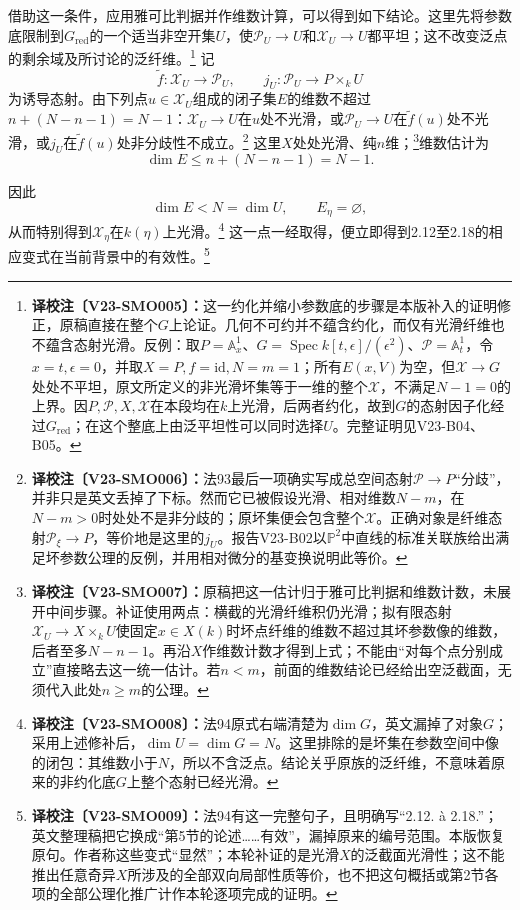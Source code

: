 \documentclass[UTF8,a4paper]{ctexbook}
\DeclareMathOperator{\Spec}{Spec}
\newcommand{\id}{\mathrm{id}}
\newcommand{\cmt}[2]{\footnote{\textbf{译校注〔#1〕：}#2}}
\begin{document}
借助这一条件，应用雅可比判据并作维数计算，可以得到如下结论。这里先将参数底限制到$G_{\mathrm{red}}$的一个适当非空开集$U$，使$\mathcal P_U\to U$和$\mathcal X_U\to U$都平坦；这不改变泛点的剩余域及所讨论的泛纤维。\cmt{V23-SMO005}{这一约化并缩小参数底的步骤是本版补入的证明修正，原稿直接在整个$G$上论证。几何不可约并不蕴含约化，而仅有光滑纤维也不蕴含态射光滑。反例：取$P=\mathbb A^1_x$、$G=\Spec k[t,\epsilon]/(\epsilon^2)$、$\mathcal P=\mathbb A^1_t$，令$x=t,\epsilon=0$，并取$X=P,f=\id,N=m=1$；所有$E(x,V)$为空，但$\mathcal X\to G$处处不平坦，原文所定义的非光滑坏集等于一维的整个$\mathcal X$，不满足$N-1=0$的上界。因$P,\mathcal P,X,\mathcal X$在本段均在$k$上光滑，后两者约化，故到$G$的态射因子化经过$G_{\mathrm{red}}$；在这个整底上由泛平坦性可以同时选择$U$。完整证明见V23-B04、B05。}
记
\[
\widetilde f:\mathcal X_U\longrightarrow\mathcal P_U,
\qquad
j_U:\mathcal P_U\longrightarrow P\times_kU
\]
为诱导态射。由下列点$u\in\mathcal X_U$组成的闭子集$E$的维数不超过$n+(N-n-1)=N-1$：$\mathcal X_U\to U$在$u$处不光滑，或$\mathcal P_U\to U$在$\widetilde f(u)$处不光滑，或$j_U$在$\widetilde f(u)$处非分歧性不成立。\cmt{V23-SMO006}{法93最后一项确实写成总空间态射$\mathcal P\to P$“分歧”，并非只是英文丢掉了下标。然而它已被假设光滑、相对维数$N-m$，在$N-m>0$时处处不是非分歧的；原坏集便会包含整个$\mathcal X$。正确对象是纤维态射$\mathcal P_\xi\to P$，等价地是这里的$j_U$。报告V23-B02以$\mathbb P^2$中直线的标准关联族给出满足坏参数公理的反例，并用相对微分的基变换说明此等价。}
这里$X$处处光滑、纯$n$维；\cmt{V23-SMO007}{原稿把这一估计归于雅可比判据和维数计数，未展开中间步骤。补证使用两点：横截的光滑纤维积仍光滑；拟有限态射$\mathcal X_U\to X\times_kU$使固定$x\in X(k)$时坏点纤维的维数不超过其坏参数像的维数，后者至多$N-n-1$。再沿$X$作维数计数才得到上式；不能由“对每个点分别成立”直接略去这一统一估计。若$n<m$，前面的维数结论已经给出空泛截面，无须代入此处$n\geq m$的公理。}维数估计为
\[
\dim E\leq n+(N-n-1)=N-1.
\]

因此
\[
\dim E<N=\dim U,
\qquad E_\eta=\varnothing,
\]
从而特别得到$\mathcal X_\eta$在$k(\eta)$上光滑。\cmt{V23-SMO008}{法94原式右端清楚为$\dim G$，英文漏掉了对象$G$；采用上述修补后，$\dim U=\dim G=N$。这里排除的是坏集在参数空间中像的闭包：其维数小于$N$，所以不含泛点。结论关乎原族的泛纤维，不意味着原来的非约化底$G$上整个态射已经光滑。}
这一点一经取得，便立即得到2.12至2.18的相应变式在当前背景中的有效性。\cmt{V23-SMO009}{法94有这一完整句子，且明确写“2.12. à 2.18.”；英文整理稿把它换成“第5节的论述……有效”，漏掉原来的编号范围。本版恢复原句。作者称这些变式“显然”；本轮补证的是光滑$X$的泛截面光滑性；这不能推出任意奇异$X$所涉及的全部双向局部性质等价，也不把这句概括或第2节各项的全部公理化推广计作本轮逐项完成的证明。}
\end{document}
